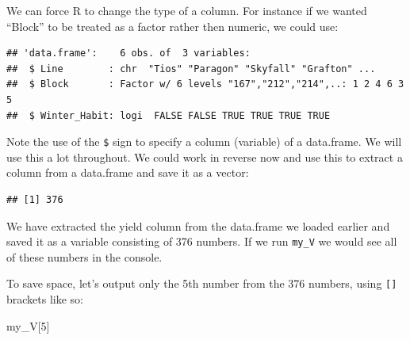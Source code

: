 \documentclass[
]{book}
\newenvironment{Shaded}{\begin{snugshade}}{\end{snugshade}}
\newcommand{\DecValTok}[1]{\textcolor[rgb]{0.00,0.00,0.81}{#1}}
\newcommand{\FunctionTok}[1]{\textcolor[rgb]{0.00,0.00,0.00}{#1}}
\newcommand{\NormalTok}[1]{#1}
\newcommand{\OtherTok}[1]{\textcolor[rgb]{0.56,0.35,0.01}{#1}}
\newcommand{\SpecialCharTok}[1]{\textcolor[rgb]{0.00,0.00,0.00}{#1}}
\begin{document}
We can force R to change the type of a column. For instance if we wanted ``Block'' to be treated as a factor rather then numeric, we could use:

\begin{Shaded}
\end{Shaded}

\begin{verbatim}
## 'data.frame':    6 obs. of  3 variables:
##  $ Line        : chr  "Tios" "Paragon" "Skyfall" "Grafton" ...
##  $ Block       : Factor w/ 6 levels "167","212","214",..: 1 2 4 6 3 5
##  $ Winter_Habit: logi  FALSE FALSE TRUE TRUE TRUE TRUE
\end{verbatim}

Note the use of the \texttt{\$} sign to specify a column (variable) of a data.frame. We will use this a lot throughout. We could work in reverse now and use this to extract a column from a data.frame and save it as a vector:

\begin{Shaded}
\end{Shaded}

\begin{verbatim}
## [1] 376
\end{verbatim}

We have extracted the yield column from the data.frame we loaded earlier and saved it as a variable consisting of 376 numbers. If we run \texttt{my\_V} we would see all of these numbers in the console.

To save space, let's output only the 5th number from the 376 numbers, using \texttt{{[}{]}} brackets like so:

\begin{Shaded}
\begin{Highlighting}[]
\NormalTok{my\_V[}\DecValTok{5}\NormalTok{]}
\end{Highlighting}
\end{Shaded}
\end{document}
